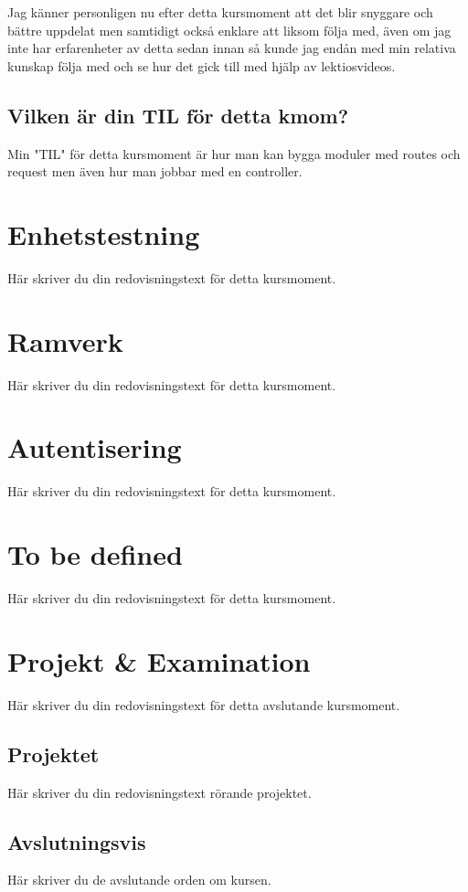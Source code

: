 \documentclass[oneside]{book}
\begin{document}
Jag känner personligen nu efter detta kursmoment att det blir snyggare och bättre uppdelat men samtidigt också enklare
att liksom följa med, även om jag inte har erfarenheter av detta sedan innan så kunde jag endån med min relativa kunskap
följa med och se hur det gick till med hjälp av lektiosvideos.

\section{Vilken är din TIL för detta kmom?}

Min "TIL" för detta kursmoment är hur man kan bygga moduler med routes och request men även hur man jobbar med en controller.

\chapter{Enhetstestning}

Här skriver du din redovisningstext för detta kursmoment.



\chapter{Ramverk}

Här skriver du din redovisningstext för detta kursmoment.



\chapter{Autentisering}

Här skriver du din redovisningstext för detta kursmoment.



\chapter{To be defined}

Här skriver du din redovisningstext för detta kursmoment.



\chapter{Projekt \& Examination}

Här skriver du din redovisningstext för detta avslutande kursmoment.

\section{Projektet}

Här skriver du din redovisningstext rörande projektet.

\section{Avslutningsvis}

Här skriver du de avslutande orden om kursen.



\newpage
\printbibliography
\end{document}
